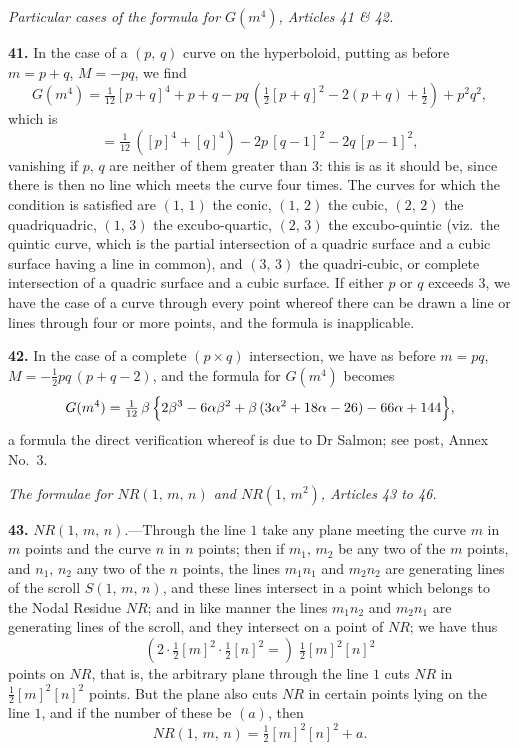 \documentclass[11pt,a4paper]{article}
\begin{document}
\bigskip

\begin{center}
\textit{Particular cases of the formula for $G(m^4)$, Articles 41 \& 42.}
\end{center}

\textbf{41.} In the case of a $(p,\,q)$ curve on the hyperboloid, putting as before $m = p+q$, $M = -pq$, we find
\[
G(m^4) = \tfrac{1}{12}[p+q]^4 + p + q - pq\,(\tfrac{1}{2}[p+q]^2 - 2(p+q) + \tfrac{1}{2}) + p^2 q^2,
\]
which is
\[
= \tfrac{1}{12}\,([p]^4 + [q]^4) - 2p\,[q-1]^2 - 2q\,[p-1]^2,
\]
vanishing if $p,\,q$ are neither of them greater than $3$: this is as it should be, since there is then no line which meets the curve four times. The curves for which the condition is satisfied are $(1,\,1)$ the conic, $(1,\,2)$ the cubic, $(2,\,2)$ the quadriquadric, $(1,\,3)$ the excubo-quartic, $(2,\,3)$ the excubo-quintic (viz.\ the quintic curve, which is the partial intersection of a quadric surface and a cubic surface having a line in common), and $(3,\,3)$ the quadri-cubic, or complete intersection of a quadric surface and a cubic surface. If either $p$ or $q$ exceeds $3$, we have the case of a curve through every point whereof there can be drawn a line or lines through four or more points, and the formula is inapplicable.

\medskip

\textbf{42.} In the case of a complete $(p \times q)$ intersection, we have as before $m = pq$, $M = -\tfrac{1}{2}pq\,(p+q-2)$, and the formula for $G(m^4)$ becomes
\[
G(m^4) = \tfrac{1}{12}\,\beta\,\Bigl\{ 2\beta^3 - 6\alpha\beta^2 + \beta\,(3\alpha^2 + 18\alpha - 26) - 66\alpha + 144 \Bigr\},
\]
a formula the direct verification whereof is due to Dr Salmon; see post, Annex No.~3.

\bigskip

\begin{center}
\textit{The formulae for $NR(1,\,m,\,n)$ and $NR(1,\,m^2)$, Articles 43 to 46.}
\end{center}

\textbf{43.} $NR(1,\,m,\,n)$.---Through the line $1$ take any plane meeting the curve $m$ in $m$ points and the curve $n$ in $n$ points; then if $m_1,\,m_2$ be any two of the $m$ points, and $n_1,\,n_2$ any two of the $n$ points, the lines $m_1 n_1$ and $m_2 n_2$ are generating lines of the scroll $S(1,\,m,\,n)$, and these lines intersect in a point which belongs to the Nodal Residue $NR$; and in like manner the lines $m_1 n_2$ and $m_2 n_1$ are generating lines of the scroll, and they intersect on a point of $NR$; we have thus
\[
(2 \cdot \tfrac{1}{2}[m]^2 \cdot \tfrac{1}{2}[n]^2 =)\; \tfrac{1}{2}[m]^2 [n]^2
\]
points on $NR$, that is, the arbitrary plane through the line $1$ cuts $NR$ in $\tfrac{1}{2}[m]^2 [n]^2$ points. But the plane also cuts $NR$ in certain points lying on the line $1$, and if the number of these be $(a)$, then
\[
NR(1,\,m,\,n) = \tfrac{1}{2}[m]^2 [n]^2 + a.
\]
\end{document}
